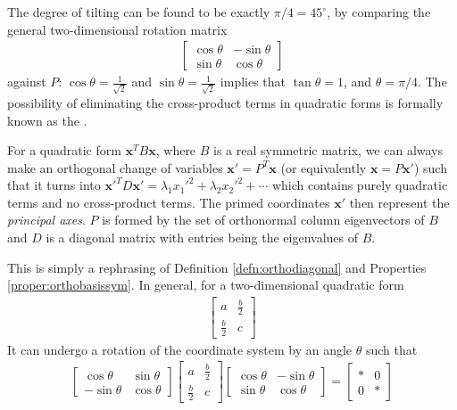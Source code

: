 The degree of tilting can be found to be exactly $\pi/4 = 45^{\circ}$, by comparing the general two-dimensional rotation matrix
\begin{align*}
\begin{bmatrix}
\cos \theta & -\sin \theta \\
\sin \theta & \cos \theta
\end{bmatrix}
\end{align*}
against $P$: $\cos \theta = \frac{1}{\sqrt{2}}$ and $\sin \theta = \frac{1}{\sqrt{2}}$ implies that $\tan \theta = 1$, and $\theta = \pi/4$. The possibility of eliminating the cross-product terms in quadratic forms is formally known as the .

\begin{thm}
For a quadratic form $\textbf{x}^TB\textbf{x}$, where $B$ is a real symmetric matrix, we can always make an orthogonal change of variables $\textbf{x}' = P^T\textbf{x}$ (or equivalently $\textbf{x} = P\textbf{x}'$) such that it turns into $\textbf{x}'^TD\textbf{x}' = \lambda_1 x_1'^2 + \lambda_2 x_2'^2 + \cdots$ which contains purely quadratic terms and no cross-product terms. The primed coordinates $\textbf{x}'$ then represent the \textit{principal axes}. $P$ is formed by the set of orthonormal column eigenvectors of $B$ and $D$ is a diagonal matrix with entries being the eigenvalues of $B$.
\end{thm}
This is simply a rephrasing of Definition \ref{defn:orthodiagonal} and Properties \ref{proper:orthobasissym}. In general, for a two-dimensional quadratic form
\begin{align*}
\begin{bmatrix}
a & \frac{b}{2} \\
\frac{b}{2} & c
\end{bmatrix}
\end{align*}
It can undergo a rotation of the coordinate system by an angle $\theta$ such that
\begin{align}
\begin{bmatrix}
\cos \theta & \sin \theta \\
-\sin \theta & \cos \theta
\end{bmatrix}
\begin{bmatrix}
a & \frac{b}{2} \\
\frac{b}{2} & c
\end{bmatrix}
\begin{bmatrix}
\cos \theta & -\sin \theta \\
\sin \theta & \cos \theta
\end{bmatrix}
=
\begin{bmatrix}
* & 0\\
0 & *
\end{bmatrix}
\label{eqn:rotate2dquadmat}
\end{align}
